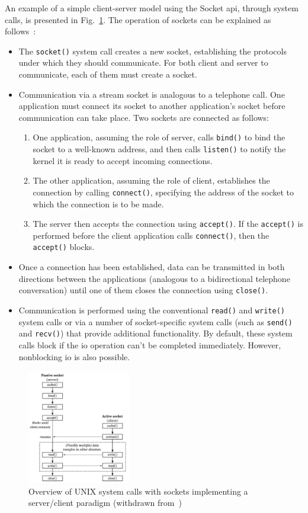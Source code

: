 An example of a simple client-server model using the Socket \gls{api}, through system
calls, is presented in Fig.~\ref{fig:cli-serv-operation}. The operation of sockets can be explained as
follows~\cite{kerrisk2010linux}:
\begin{itemize}
\item The \texttt{socket()} system call creates a new socket, establishing the
  protocols under which they should communicate. For both client and server to
communicate, each of them must create a socket.
\item  Communication via a stream socket is analogous to a telephone call. One
application must connect its socket to another application’s socket before
communication can take place. Two sockets are connected as follows:
\begin{enumerate}
\item One application, assuming the role of server, calls \texttt{bind()} to
  bind the socket to a well-known address, and then calls \texttt{listen()} to
  notify the kernel it is ready to accept incoming connections.
\item The other application, assuming the role of client, establishes the
  connection by calling \texttt{connect()}, specifying the address of the socket
  to which the connection is to be made.
\item The server then accepts the connection using \texttt{accept()}. If the
  \texttt{accept()} is performed before the client application calls
  \texttt{connect()}, then the \texttt{accept()} blocks.
\end{enumerate}
\item Once a connection has been established, data can be transmitted in both
directions between the applications (analogous to a bidirectional telephone
conversation) until one of them closes the connection using \texttt{close()}.
\item Communication is performed using the conventional \texttt{read()} and
  \texttt{write()} system calls or via a number of socket-specific system calls
  (such as \texttt{send()} and \texttt{recv()}) that provide additional
  functionality. By default, these system calls block if the \gls{io} operation
  can’t be completed immediately. However, nonblocking \gls{io} is also
  possible.
\end{itemize}
\begin{figure}[!hbt]
\centering
    \includegraphics[width=0.4\textwidth]{./img/cli-serv-operation.png}
  \caption{Overview of UNIX system calls with sockets implementing 
a server/client paradigm (withdrawn from~\cite{kerrisk2010linux})}%
\label{fig:cli-serv-operation}
\end{figure}
%
